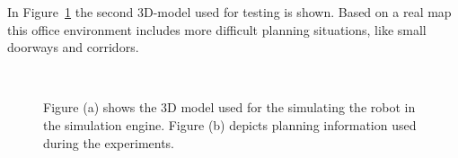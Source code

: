 In Figure~\ref{fig:gazebo_gh25} the second 3D-model used for testing is shown. Based on a real map this office environment includes more difficult planning situations, like small doorways and corridors.

\begin{figure}[thpb]
     \footnotesize
      \centering
      \myfloatalign
      \setlength\fboxsep{0pt}
      \setlength\fboxrule{0.5pt}
       \\
       \caption[Simulation: office environment]{Figure (a) shows the 3D model used for the simulating the robot in the simulation engine. Figure (b) depicts planning information used during the experiments.}
      \label{fig:gazebo_gh25}
   \end{figure}


